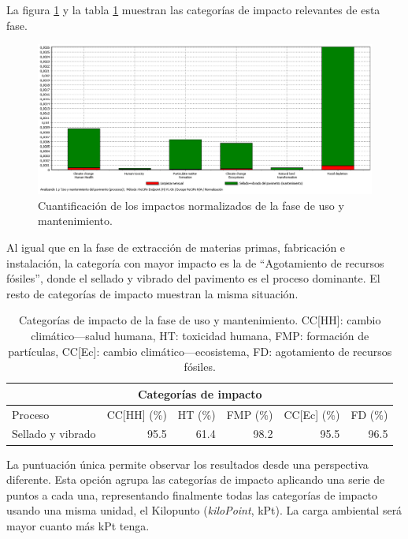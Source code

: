 La figura \ref{fig:uso_normalizacion} y la tabla \ref{categoriasimpactouso} muestran las categorías de impacto relevantes de esta fase.

\begin{figure}[!htb]
\centering
\includegraphics[width=15cm]{img/uso_normalizacion.png}
\caption{Cuantificación de los impactos normalizados de la fase de uso y mantenimiento.}
\label{fig:uso_normalizacion}
\end{figure}

Al igual que en la fase de extracción de materias primas, fabricación e instalación, la categoría con mayor impacto es la de ``Agotamiento de recursos fósiles'', donde el sellado y vibrado del pavimento es el proceso dominante. El resto de categorías de impacto muestran la misma situación.

\begin{table}[!htb]
\centering
\begin{tabular}{p{4cm}rrrrr}
\toprule
\multicolumn{6}{c}{Categorías de impacto}\\
\midrule
Proceso & CC[HH] (\%) & HT (\%) & FMP (\%) & CC[Ec] (\%) & FD (\%)\\
\midrule
Sellado y vibrado & 95.5 & 61.4 & 98.2 & 95.5 & 96.5\\
\bottomrule
\end{tabular}
\caption[Categorías de impacto de la fase de uso y mantenimiento.]{Categorías de impacto de la fase de uso y mantenimiento. CC[HH]: cambio climático—salud humana, HT: toxicidad humana, FMP: formación de partículas, CC[Ec]: cambio climático—ecosistema, FD: agotamiento de recursos fósiles.}
\label{categoriasimpactouso}
\end{table}

La puntuación única permite observar los resultados desde una perspectiva diferente. Esta opción agrupa las categorías de impacto aplicando una serie de puntos a cada una, representando finalmente todas las categorías de impacto usando una misma unidad, el Kilopunto (\textit{kiloPoint}, kPt). La carga ambiental será mayor cuanto más kPt tenga.

